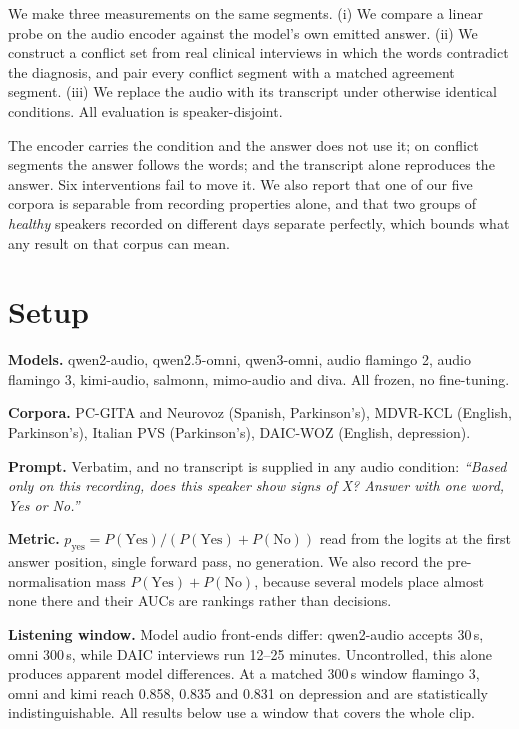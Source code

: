 \documentclass{article}
\begin{document}
We make three measurements on the same segments. (i) We compare a linear probe on the audio
encoder against the model's own emitted answer. (ii) We construct a conflict set from real
clinical interviews in which the words contradict the diagnosis, and pair every conflict
segment with a matched agreement segment. (iii) We replace the audio with its transcript under
otherwise identical conditions. All evaluation is speaker-disjoint.

The encoder carries the condition and the answer does not use it; on conflict segments the
answer follows the words; and the transcript alone reproduces the answer. Six interventions
fail to move it. We also report that one of our five corpora is separable from recording
properties alone, and that two groups of \emph{healthy} speakers recorded on different days
separate perfectly, which bounds what any result on that corpus can mean.

\section{Setup}\label{sec:setup}

\noindent\textbf{Models.} qwen2-audio, qwen2.5-omni, qwen3-omni, audio flamingo 2, audio
flamingo 3, kimi-audio, salmonn, mimo-audio and diva. All frozen, no fine-tuning.

\noindent\textbf{Corpora.} PC-GITA and Neurovoz (Spanish, Parkinson's), MDVR-KCL (English,
Parkinson's), Italian PVS (Parkinson's), DAIC-WOZ (English, depression).

\noindent\textbf{Prompt.} Verbatim, and no transcript is supplied in any audio condition:
\emph{``Based only on this recording, does this speaker show signs of X? Answer with one word,
Yes or No.''}

\noindent\textbf{Metric.} $p_{\text{yes}} = P(\text{Yes})/(P(\text{Yes})+P(\text{No}))$ read
from the logits at the first answer position, single forward pass, no generation. We also
record the pre-normalisation mass $P(\text{Yes})+P(\text{No})$, because several models place
almost none there and their AUCs are rankings rather than decisions.

\noindent\textbf{Listening window.} Model audio front-ends differ: qwen2-audio accepts 30\,s,
omni 300\,s, while DAIC interviews run 12--25 minutes. Uncontrolled, this alone produces
apparent model differences. At a matched 300\,s window flamingo 3, omni and kimi reach 0.858,
0.835 and 0.831 on depression and are statistically indistinguishable. All results below use a
window that covers the whole clip.
\end{document}
